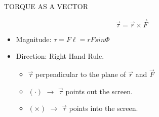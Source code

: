 \documentclass[]{beamer}
\begin{document}
    
    



  \begin{frame}

    TORQUE AS A VECTOR
    
    \vspace{7mm}
 

    \begin{equation}
      \boxed{\vec{\tau}=\vec{r} \times \vec{F}}
    \end{equation}
     
    
    \pause

    \begin{itemize}
      \item Magnitude: $\tau=F\ell=rFsin\Phi$
      \vspace{5mm}
      \item Direction: Right Hand Rule.
      \vspace{5mm}
      \begin{itemize}
        \item $\vec{\tau}$ perpendicular to the plane of $\vec{r}$ and $\vec{F}$
        \item $(\cdot)$ $\rightarrow$ $\vec{\tau}$ points out the screen.
        \item $(\times)$ $\rightarrow$ $\vec{\tau}$ points into the screen.
      \end{itemize}
    \end{itemize}
 
   \end{frame}
     

  


      
  


\end{document}
